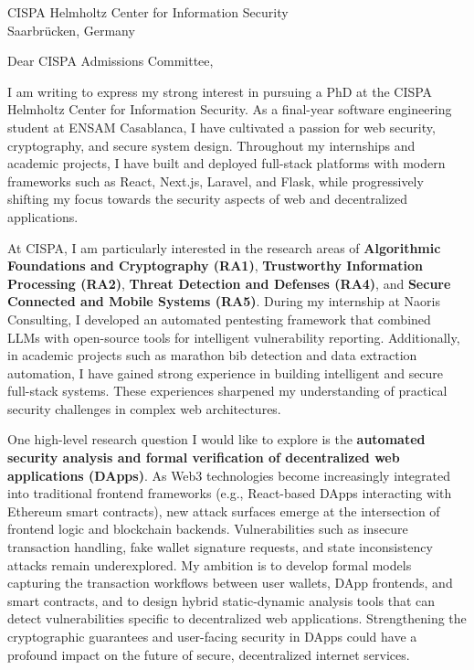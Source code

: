 \documentclass[11pt,a4paper]{letter}
\begin{document}
\begin{letter}{CISPA Helmholtz Center for Information Security\\ Saarbrücken, Germany}

\opening{Dear CISPA Admissions Committee,}

I am writing to express my strong interest in pursuing a PhD at the CISPA Helmholtz Center for Information Security. As a final-year software engineering student at ENSAM Casablanca, I have cultivated a passion for web security, cryptography, and secure system design. Throughout my internships and academic projects, I have built and deployed full-stack platforms with modern frameworks such as React, Next.js, Laravel, and Flask, while progressively shifting my focus towards the security aspects of web and decentralized applications.

At CISPA, I am particularly interested in the research areas of \textbf{Algorithmic Foundations and Cryptography (RA1)}, \textbf{Trustworthy Information Processing (RA2)}, \textbf{Threat Detection and Defenses (RA4)}, and \textbf{Secure Connected and Mobile Systems (RA5)}. During my internship at Naoris Consulting, I developed an automated pentesting framework that combined LLMs with open-source tools for intelligent vulnerability reporting. Additionally, in academic projects such as marathon bib detection and data extraction automation, I have gained strong experience in building intelligent and secure full-stack systems. These experiences sharpened my understanding of practical security challenges in complex web architectures.

One high-level research question I would like to explore is the \textbf{automated security analysis and formal verification of decentralized web applications (DApps)}. As Web3 technologies become increasingly integrated into traditional frontend frameworks (e.g., React-based DApps interacting with Ethereum smart contracts), new attack surfaces emerge at the intersection of frontend logic and blockchain backends. Vulnerabilities such as insecure transaction handling, fake wallet signature requests, and state inconsistency attacks remain underexplored. My ambition is to develop formal models capturing the transaction workflows between user wallets, DApp frontends, and smart contracts, and to design hybrid static-dynamic analysis tools that can detect vulnerabilities specific to decentralized web applications. Strengthening the cryptographic guarantees and user-facing security in DApps could have a profound impact on the future of secure, decentralized internet services.


\end{letter}
\end{document}
